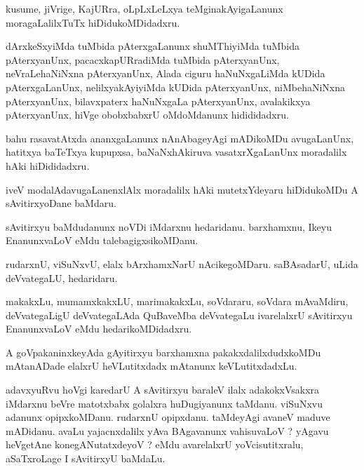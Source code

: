 \documentclass{article}
\begin{document}
\begin{mn}
kusume, jiVrige, KajURra, oLpLxLeLxya  teMginakAyigaLanunx moragaLalilxTuTx  hiDidukoMDidadxru.
\end{mn}

\begin{mn}
dArxkeSxyiMda  tuMbida pAterxgaLanunx shuMThiyiMda tuMbida pAterxyanUnx, pacacxkapURradiMda 
tuMbida  pAterxyanUnx,  neVraLehaNiNxna pAterxyanUnx, Alada  ciguru haNuNxgaLiMda kUDida  
pAterxgaLanUnx,  nelilxyakAyiyiMda kUDida  pAterxyanUnx, niMbehaNiNxna pAterxyanUnx, bilavxpaterx 
haNuNxgaLa pAterxyanUnx,  avalakikxya  pAterxyanUnx,  hiVge obobxbabxrU  oMdoMdanunx hidididadxru. 
\end{mn}

\begin{mn}
bahu rasavatAtxda ananxgaLanunx  nAnAbageyAgi mADikoMDu avugaLanUnx, hatitxya baTeTxya 
kupupxsa,  baNaNxhAkiruva vasatxrXgaLanUnx moradalilx hAki hiDididadxru.
\end{mn}

\begin{mn}
iveV modalAdavugaLanenxlAlx  moradalilx hAki mutetxYdeyaru hiDidukoMDu A sAvitirxyoDane baMdaru.
\end{mn}

\begin{mn}
sAvitirxyu  baMdudanunx  noVDi  iMdarxnu  hedaridanu.  barxhamxnu,  Ikeyu EnanunxvaLoV 
eMdu talebagigxsikoMDanu.
\end{mn}

\begin{mn}
rudarxnU, viSuNxvU, elalx  bArxhamxNarU  nAcikegoMDaru.  saBAsadarU, uLida deVvategaLU, hedaridaru.
\end{mn}

\begin{mn}
makakxLu, mumamxkakxLU,  marimakakxLu, soVdararu,  soVdara mAvaMdiru, deVvategaLigU deVvategaLAda QuBaveMba 
deVvategaLu ivarelalxrU  sAvitirxyu  EnanunxvaLoV eMdu hedarikoMDidadxru. 
\end{mn}

\begin{mn}
A goVpakaninxkeyAda  gAyitirxyu  barxhamxna pakakxdalilxdudxkoMDu  mAtanADade elalxrU 
heVLutitxdadx mAtanunx keVLutitxdadxLu.
\end{mn}

\begin{mn}
adavxyuRvu hoVgi karedarU A sAvitirxyu baraleV ilalx  adakokxVsakxra iMdarxnu beVre matotxbabx 
golalxra huDugiyanunx taMdanu.  viSuNxvu adanunx opipxkoMDanu.  rudarxnU opipxdanu. taMdeyAgi 
avaneV maduve mADidanu.  avaLu yajacnxdalilx yAva BAgavanunx vahisuvaLoV ?  yAgavu heVgetAne 
konegANutatxdeyoV ?  eMdu avarelalxrU  yoVcisutitxralu,  aSaTxroLage I sAvitirxyU baMdaLu.
\end{mn}
\end{document}
